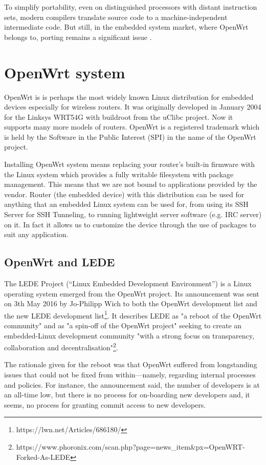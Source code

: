To simplify portability, even on distinguished processors with distant instruction sets, modern compilers translate source code to a machine-independent intermediate code.
But still, in the embedded system market, where OpenWrt belongs to, porting remains a significant issue \cite{porting_software}.

\section{OpenWrt system}\label{owrt}
OpenWrt is is perhaps the most widely known Linux distribution for embedded devices especially for wireless routers.
It was originally developed in January 2004 for the Linksys WRT54G with buildroot from the uClibc project.
Now it supports many more models of routers.
OpenWrt is a registered trademark which is held by the Software in the Public Interest (SPI) in the name of the OpenWrt project.

Installing OpenWrt system means replacing your router’s built-in firmware with the Linux system which provides a fully writable filesystem with package management.
This means that we are not bound to applications provided by the vendor.
Router (the embedded device) with this distribution can be used for anything that an embedded Linux system can be used for, from using its SSH Server for SSH Tunneling, to running lightweight server software (e.g. IRC server) on it.
In fact it allows us to customize the device through the use of packages to suit any application.

\subsection{OpenWrt and LEDE}

The LEDE Project (“Linux Embedded Development Environment”) is a Linux operating system emerged from the OpenWrt project.
Its announcement was sent on 3th May 2016 by Jo-Philipp Wich to both the OpenWrt development list and the new LEDE development list\footnote{https://lwn.net/Articles/686180/}.
It describes LEDE as "a reboot of the OpenWrt community" and as "a spin-off of the OpenWrt project" seeking to create an embedded-Linux development community "with a strong focus on transparency, collaboration and decentralisation"\footnote{https://www.phoronix.com/scan.php?page=news\_item\&px=OpenWRT-Forked-As-LEDE}.

The rationale given for the reboot was that OpenWrt suffered from longstanding issues that could not be fixed from within—namely, regarding internal processes and policies.
For instance, the announcement said, the number of developers is at an all-time low, but there is no process for on-boarding new developers and, it seems, no process for granting commit access to new developers.

